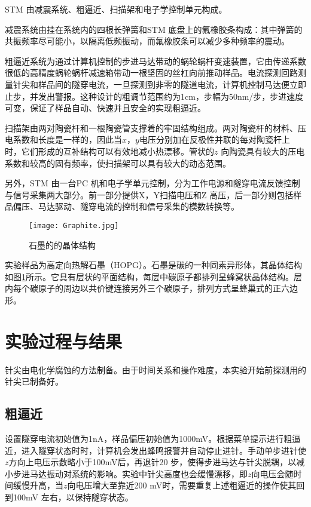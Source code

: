 \documentclass[aps,pre,12pt,preprint,onecolumn,showpacs,showkeys]{revtex4-1}
\begin{document}
STM 由减震系统、粗逼近、扫描架和电子学控制单元构成。

减震系统由挂在系统内的四根长弹簧和STM 底盘上的氟橡胶条构成：其中弹簧的共振频率尽可能小，以隔离低频振动，而氟橡胶条可以减少多种频率的震动。

粗逼近系统为通过计算机控制的步进马达带动的蜗轮蜗杆变速装置，它由传递系数很低的高精度蜗轮蜗杆减速箱带动一根坚固的丝杠向前推动样品。电流探测回路测量针尖和样品间的隧穿电流，一旦探测到非零的隧道电流，计算机控制马达便立即止步，并发出警报。这种设计的粗调节范围约为1cm，步幅为50nm/步，步进速度可变，保证了样品自动、快速并且安全的实现粗逼近。

扫描架由两对陶瓷杆和一根陶瓷管支撑着的牢固结构组成。两对陶瓷杆的材料、压电系数和长度是一样的，因此当$x$，$y$电压分别加在反极性并联的每对陶瓷杆上时，它们形成的互补结构可以有效地减小热漂移。管状的$z$ 向陶瓷具有较大的压电系数和较高的固有频率，使扫描架可以具有较大的动态范围。

另外，STM 由一台PC 机和电子学单元控制，分为工作电源和隧穿电流反馈控制与信号采集两大部分。前一部分提供X，Y扫描电压和Z 高压，后一部分则包括样品偏压、马达驱动、隧穿电流的控制和信号采集的模数转换等。
\begin{figure}[h]
\centering
\texttt{[image: Graphite.jpg]}
\caption{\label{fig:structure}%
石墨的的晶体结构}
\end{figure}

实验样品为高定向热解石墨（HOPG）。石墨是碳的一种同素异形体，其晶体结构如图\ref{fig:structure}所示。它具有层状的平面结构，每层中碳原子都排列呈蜂窝状晶体结构。层内每个碳原子的周边以共价键连接另外三个碳原子，排列方式呈蜂巢式的正六边形。

\section{实验过程与结果}
针尖由电化学腐蚀的方法制备。由于时间关系和操作难度，本实验开始前探测用的针尖已制备好。

\subsection{粗逼近}
设置隧穿电流初始值为1nA，样品偏压初始值为1000mV。根据菜单提示进行粗逼近，进入隧穿状态时时，计算机会发出蜂鸣报警并自动停止进针。手动单步进针使$z$方向上电压示数略小于100mV后，再退针20 步，使得步进马达与针尖脱耦，以减小步进马达振动对系统的影响。实验中针尖高度也会缓慢漂移，即$z$向电压会随时间缓慢升高，当$z$向电压增大至靠近200 mV时，需要重复上述粗逼近的操作使其回到100mV 左右，以保持隧穿状态。
\end{document}
